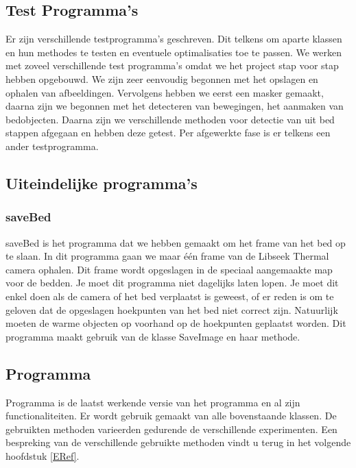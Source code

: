 \subsection{Test Programma's}
\label{mRefTPr}
Er zijn verschillende testprogramma's geschreven. Dit telkens om aparte klassen en hun methodes te testen en eventuele optimalisaties toe te passen. We werken met zoveel verschillende test programma's omdat we het project stap voor stap hebben opgebouwd. We zijn zeer eenvoudig begonnen met het opslagen en ophalen van afbeeldingen. Vervolgens hebben we eerst een masker gemaakt, daarna zijn we begonnen met het detecteren van bewegingen, het aanmaken van bedobjecten. Daarna zijn we verschillende methoden voor detectie van uit bed stappen afgegaan en hebben deze getest. Per afgewerkte fase is er telkens een ander testprogramma.

\subsection{Uiteindelijke programma's}
\subsubsection{saveBed}
saveBed is het programma dat we hebben gemaakt om het frame van het bed op te slaan. In dit programma gaan we maar \'e\'en frame van de Libseek Thermal camera ophalen. Dit frame wordt opgeslagen in de speciaal aangemaakte map voor de bedden. Je moet dit programma niet dagelijks laten lopen. Je moet dit enkel doen als de camera of het bed verplaatst is geweest, of er reden is om te geloven dat de opgeslagen hoekpunten van het bed niet correct zijn. Natuurlijk moeten de warme objecten op voorhand op de hoekpunten geplaatst worden. Dit programma maakt gebruik van de klasse SaveImage en haar methode.

\subsection{Programma} 
Programma is de laatst werkende versie van het programma en al zijn functionaliteiten. Er wordt gebruik gemaakt van alle bovenstaande klassen. De gebruikten methoden varieerden gedurende de verschillende experimenten. Een bespreking van de verschillende gebruikte methoden vindt u terug in het volgende hoofdstuk \ref{ERef}.
